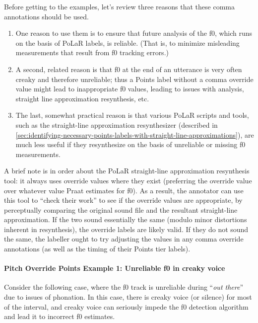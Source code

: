 \documentclass[11pt, twoside]{memoir}
\def\langtext#1{\textit{#1}}
\begin{document}
Before getting to the examples, let’s review three reasons that these comma annotations should be used.
\begin{enumerate}
	\item One reason to use them is to ensure that future analysis of the f0, which runs on the basis of PoLaR labels, is reliable. (That is, to minimize misleading measurements that result from f0 tracking errors.)
	\item A second, related reason is that f0 at the end of an utterance is very often creaky and therefore unreliable; thus a Points label without a comma override value might lead to inappropriate f0 values, leading to issues with analysis, straight line approximation resynthesis, etc.
	\item The last, somewhat practical  reason is that various PoLaR scripts and tools, such as the straight-line approximation resynthesizer (described in \ref{sec:identifying-necessary-points-labels-with-straight-line-approximations}), are much less useful if they resynthesize on the basis of unreliable or missing f0 measurements.
\end{enumerate}

A brief note is in order about the PoLaR straight-line approximation resynthesis tool: it always uses override values where they exist (preferring the override value over whatever value Praat estimates for f0). As a result, the annotator can use this tool to “check their work” to see if the override values are appropriate, by perceptually comparing the original sound file and the resultant straight-line approximation. If the two sound essentially the same (modulo minor distortions inherent in resynthesis), the override labels are likely valid. If they do not sound the same, the labeller ought to try adjusting the values in any comma override annotations (as well as the timing of their Points tier labels).

\paragraph{Pitch Override Points Example 1: Unreliable f0 in creaky voice\label{pitch-override-points-example-1}}

Consider the following case, where the f0 track is unreliable during “\langtext{out there}” due to issues of phonation. In this case, there is creaky voice (or silence) for most of the interval, and creaky voice can seriously impede the f0 detection algorithm and lead it to incorrect f0 estimates.
\end{document}
